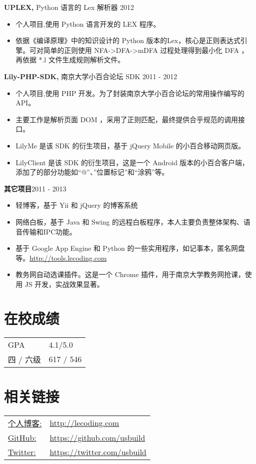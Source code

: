 \documentclass[margin]{res}
\begin{document}
\begin{resume}
{\bf UPLEX,} Python 语言的 Lex 解析器 \hfill 2012
\begin{itemize} \itemsep -2pt
\item 个人项目,使用 Python 语言开发的 LEX 程序。
\item 依据《编译原理》中的知识设计的 Python 版本的Lex，核心是正则表达式引擎。可对简单的正则使用 NFA->DFA->mDFA 过程处理得到最小化 DFA ，再依据 *.l 文件生成规则解析文件。
\end{itemize}

{\bf Lily-PHP-SDK,} 南京大学小百合论坛 SDK \hfill 2011 - 2012
\begin{itemize} \itemsep -2pt
\item 个人项目,使用 PHP 开发。为了封装南京大学小百合论坛的常用操作编写的 API。
\item 主要工作是解析页面 DOM ，采用了正则匹配，最终提供合乎规范的调用接口。
\item LilyMe 是该 SDK 的衍生项目，基于 jQuery Mobile 的小百合移动网页版。
\item LilyClient 是该 SDK 的衍生项目，这是一个 Android 版本的小百合客户端，添加了的部分功能如“@”、”位置标记”和“涂鸦”等。
\end{itemize}

{\bf 其它项目}\hfill 2011 - 2013
\begin{itemize} \itemsep -2pt
\item 轻博客，基于 Yii 和 jQuery 的博客系统
\item 网络白板，基于 Java 和 Swing 的远程白板程序，本人主要负责整体架构、语音传输和IPC功能。
\item 基于 Google App Engine 和 Python 的一些实用程序，如记事本，匿名网盘等。\href{http://tools.lecoding.com}{http://tools.lecoding.com}
\item 教务网自动选课插件。这是一个 Chrome 插件，用于南京大学教务网抢课，使用 JS 开发，实战效果显著。
\end{itemize}

\section{在校成绩} 
   \begin{tabular}{l p{3in}}
      GPA &  4.1/5.0 \\
      四 / 六级 & 617 / 546
 \end{tabular}

\section{相关链接}
   \begin{tabular}{l p{3in}}
     \underline{个人博客:} & \href{http://lecoding.com}{http://lecoding.com}\\
     \underline{GitHub:} &  \href{https://github.com/usbuild}{https://github.com/usbuild}\\
     \underline{Twitter:} & \href{https://twitter.com/usbuild}{https://twitter.com/usbuild}
 \end{tabular}

\end{resume} 
\end{document}
